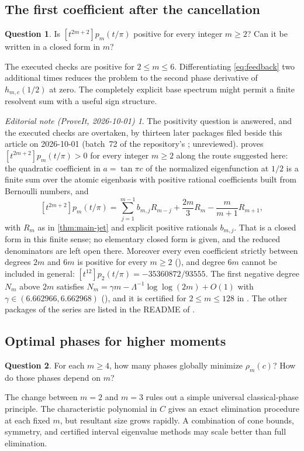 \documentclass[11pt,a4paper]{article}
\numberwithin{equation}{section}
\theoremstyle{definition}
\newtheorem{question}[question]{Question}
\theoremstyle{remark}
\newtheorem*{ednotelater}{Editorial note (ProveIt, 2026-10-01)}
\begin{document}
\subsection{The first coefficient after the cancellation}
\begin{question}
Is $[t^{2m+2}]p_m(t/\pi)$ positive for every integer $m\geq2$?
Can it be written in a closed form in $m$?
\end{question}
The executed checks are positive for $2\leq m\leq6$.
Differentiating \cref{eq:feedback} two additional times reduces the
problem to the second phase derivative of $h_{m,c}(1/2)$ at zero.
The completely explicit base spectrum might permit a finite resolvent
sum with a useful sign structure.
\begin{ednotelater}
The positivity question is answered, and the executed checks are overtaken, by thirteen later
packages filed beside this article on 2026-10-01 (batch~72 of the repository's
; unreviewed). 
proves $[t^{2m+2}]p_m(t/\pi)>0$ for every integer $m\ge2$ along the route suggested here: the
quadratic coefficient in $a=\tan\pi c$ of the normalized eigenfunction at $1/2$ is a finite sum
over the atomic eigenbasis with positive rational coefficients built from Bernoulli numbers,
and
\[
 [t^{2m+2}]p_m(t/\pi)=\sum_{j=1}^{m-1}b_{m,j}R_{m-j}+\frac{2m}{3}R_m-\frac{m}{m+1}R_{m+1},
\]
with $R_m$ as in \cref{thm:main-jet} and explicit positive rationals $b_{m,j}$. That is a
closed form in this finite sense; no elementary closed form is given, and the reduced
denominators are left open there. Moreover every even coefficient strictly between degrees
$2m$ and $6m$ is positive for every $m\ge2$
(), and degree $6m$ cannot be included in
general: $[t^{12}]p_2(t/\pi)=-35360872/93555$. The first negative degree $N_m$ above $2m$
satisfies $N_m=\gamma m-\Lambda^{-1}\log\log(2m)+O(1)$ with $\gamma\in(6.662966,6.662968)$
(), and it is certified for
$2\le m\le128$ in . The other
packages of the series are listed in the README of .
\end{ednotelater}

\subsection{Optimal phases for higher moments}
\begin{question}
For each $m\geq4$, how many phases globally minimize $\rho_m(c)$?
How do those phases depend on $m$?
\end{question}
The change between $m=2$ and $m=3$ rules out a simple universal
classical-phase principle. The characteristic polynomial in $C$ gives
an exact elimination procedure at each fixed $m$, but resultant size
grows rapidly. A combination of cone bounds, symmetry, and certified
interval eigenvalue methods may scale better than full elimination.
\end{document}
